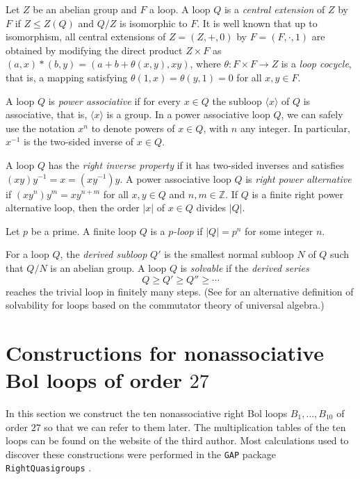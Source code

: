 \documentclass[12pt,reqno]{amsart}
\numberwithin{equation}{section}
\theoremstyle{plain}
\theoremstyle{definition}
\begin{document}
Let $Z$ be an abelian group and $F$ a loop. A loop $Q$ is a \emph{central extension} of $Z$ by $F$ if $Z\le Z(Q)$ and $Q/Z$ is isomorphic to $F$. It is well known that up to isomorphism, all central extensions of $Z=(Z,+,0)$ by $F=(F,\cdot,1)$ are obtained by modifying the direct product $Z\times F$ as $(a,x)*(b,y) = (a+b+\theta(x,y),xy)$, where $\theta:F\times F\to Z$ is a \emph{loop cocycle}, that is, a mapping satisfying $\theta(1,x)=\theta(y,1)=0$ for all $x,y\in F$.

A loop $Q$ is \emph{power associative} if for every $x\in Q$ the subloop $\langle x\rangle$ of $Q$ is associative, that is, $\langle x\rangle$ is a group. In a power associative loop $Q$, we can safely use the notation $x^n$ to denote powers of $x\in Q$, with $n$ any integer. In particular, $x^{-1}$ is the two-sided inverse of $x\in Q$.

A loop $Q$ has the \emph{right inverse property} if it has two-sided inverses and satisfies $(xy)y^{-1}=x = (xy^{-1})y$. A power associative loop $Q$ is \emph{right power alternative} if $(xy^n)y^m = xy^{n+m}$ for all $x,y\in Q$ and $n,m\in\mathbb Z$. If $Q$ is a finite right power alternative loop, then the order $|x|$ of $x\in Q$ divides $|Q|$.

Let $p$ be a prime. A finite loop $Q$ is a \emph{$p$-loop} if $|Q|=p^n$ for some integer $n$.

For a loop $Q$, the \emph{derived subloop} $Q'$ is the smallest normal subloop $N$ of $Q$ such that $Q/N$ is an abelian group. A loop $Q$ is \emph{solvable} if the \emph{derived series}
\begin{displaymath}
	Q\ge Q'\ge Q''\ge\cdots
\end{displaymath}
reaches the trivial loop in finitely many steps. (See \cite{StaVoj} for an alternative definition of solvability for loops based on the commutator theory of universal algebra.)

\section{Constructions for nonassociative Bol loops of order $27$}\label{Sc:Constructions}

In this section we construct the ten nonassociative right Bol loops $B_1,\dots,B_{10}$ of order $27$ so that we can refer to them later. The multiplication tables of the ten loops can be found on the website of the third author. Most calculations used to discover these constructions were performed in the \texttt{GAP} \cite{GAP} package \texttt{RightQuasigroups} \cite{RightQuasigroups}.
\end{document}
